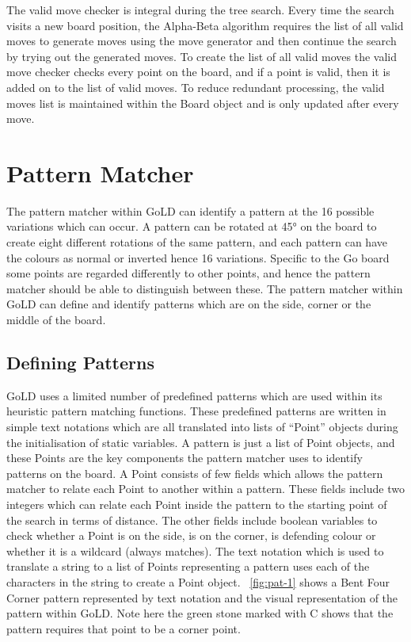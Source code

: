 \documentclass{l4proj}
\begin{document}
The valid move checker is integral during the tree search. Every time the search visits a new board position, the Alpha-Beta algorithm requires the list of all valid moves to generate moves using the move generator and then continue the search by trying out the generated moves. To create the list of all valid moves the valid move checker checks every point on the board, and if a point is valid, then it is added on to the list of valid moves. To reduce redundant processing, the valid moves list is maintained within the Board object and is only updated after every move.

\section{Pattern Matcher}
The pattern matcher within GoLD can identify a pattern at the 16 possible variations which can occur. A pattern can be rotated at 45° on the board to create eight different rotations of the same pattern, and each pattern can have the colours as normal or inverted hence 16 variations. Specific to the Go board some points are regarded differently to other points, and hence the pattern matcher should be able to distinguish between these. The pattern matcher within GoLD can define and identify patterns which are on the side, corner or the middle of the board.

\subsection{Defining Patterns}
GoLD uses a limited number of predefined patterns which are used within its heuristic pattern matching functions. These predefined patterns are written in simple text notations which are all translated into lists of “Point” objects during the initialisation of static variables. A pattern is just a list of Point objects, and these Points are the key components the pattern matcher uses to identify patterns on the board. A Point consists of few fields which allows the pattern matcher to relate each Point to another within a pattern. These fields include two integers which can relate each Point inside the pattern to the starting point of the search in terms of distance. The other fields include boolean variables to check whether a Point is on the side, is on the corner, is defending colour or whether it is a wildcard (always matches). The text notation which is used to translate a string to a list of Points representing a pattern uses each of the characters in the string to create a Point object. ~\autoref{fig:pat-1} shows a Bent Four Corner pattern represented by text notation and the visual representation of the pattern within GoLD. Note here the green stone marked with C shows that the pattern requires that point to be a corner point.
\end{document}
